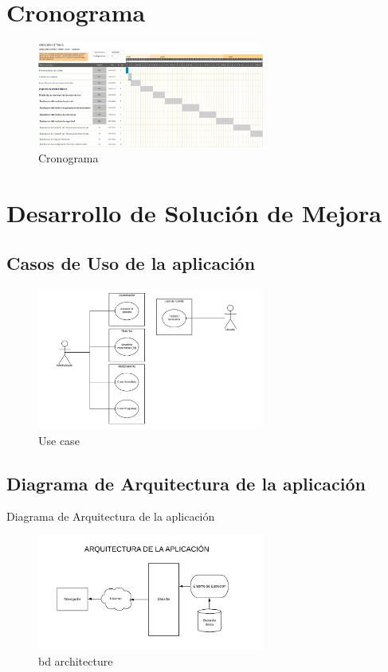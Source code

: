 \documentclass[twoside,twocolumn]{article}
\begin{document}
\section{Cronograma}
\begin{figure}[htb]
	\begin{center}
		\includegraphics[width=7.5cm]{./Imagenes/Cronograma} 
		\caption{Cronograma}
	\end{center}
\end{figure}


\section{Desarrollo de Solución de Mejora}

\subsection{Casos de Uso de la aplicación}
\begin{figure}[h!]
	\begin{center}
		\includegraphics[width=7.5cm]{./Imagenes/use_case} 
		\caption{Use case}
	\end{center}
\end{figure}

\subsection{Diagrama de Arquitectura de la aplicación}
Diagrama de Arquitectura de la aplicación
\begin{figure}[h!]
	\begin{center}
		\includegraphics[width=7.5cm]{./Imagenes/bd_architecture} 
		\caption{bd architecture}
	\end{center}
\end{figure}
\end{document}
